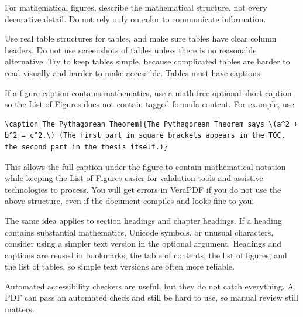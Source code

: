 \begin{biography}
For mathematical figures, describe the mathematical structure, not every decorative detail. Do not rely only on color to communicate information.

Use real table structures for tables, and make sure tables have clear column headers. Do not use screenshots of tables unless there is no reasonable alternative. Try to keep tables simple, because complicated tables are harder to read visually and harder to make accessible. Tables must have captions.

If a figure caption contains mathematics, use a math-free optional short caption so the List of Figures does not contain tagged formula content. For example, use

\begin{verbatim}
\caption[The Pythagorean Theorem]{The Pythagorean Theorem says \(a^2 + b^2 = c^2.\) (The first part in square brackets appears in the TOC, the second part in the thesis itself.)}
\end{verbatim}

This allows the full caption under the figure to contain mathematical notation while keeping the List of Figures easier for validation tools and assistive technologies to process. You will get errors in VeraPDF if you do not use the above structure, even if the document compiles and looks fine to you.

The same idea applies to section headings and chapter headings. If a heading contains substantial mathematics, Unicode symbols, or unusual characters, consider using a simpler text version in the optional argument. Headings and captions are reused in bookmarks, the table of contents, the list of figures, and the list of tables, so simple text versions are often more reliable.

Automated accessibility checkers are useful, but they do not catch everything. A PDF can pass an automated check and still be hard to use, so manual review still matters.

\end{biography}


